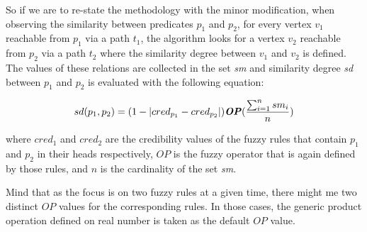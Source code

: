 \documentclass[egilmezThesis.tex]{subfiles}
\begin{document}
So if we are to re-state the methodology with the minor modification, when observing the similarity between predicates \textit{$p_{1}$} and \textit{$p_{2}$}, for every vertex \textit{$v_{1}$} reachable from \textit{$p_{1}$} via a path \textit{$t_{1}$}, the algorithm looks for a vertex \textit{$v_{2}$} reachable from \textit{$p_{2}$} via a path \textit{$t_{2}$} where the similarity degree between \textit{$v_{1}$}  and \textit{$v_{2}$} is defined. The values of these relations are collected in the set \textit{sm} and similarity degree \textit{sd} between \textit{$p_{1}$} and \textit{$p_{2}$} is evaluated with the following equation:

\begin{equation}\label{eq:sd}
\textit{$sd(p_{1}, p_{2})$} =   (1-\lvert  \textit{$cred_{p_{1}}$} - \textit{$cred_{p_{2}}$}  \rvert) \textbf{\emph{OP}} (\frac{\sum_{i=1}^{n} sm_i}{n})
\end{equation}

where $cred_{1}$ and  $cred_{2}$ are the credibility values of the fuzzy rules that contain \textit{$p_{1}$} and \textit{$p_{2}$} in their heads respectively, \textit{$OP$} is the fuzzy operator that is again defined by those rules, and  \textit{$n$} is the cardinality of the set \textit{sm}.

Mind that as the focus is on two fuzzy rules at a given time, there might me two distinct \textit{$OP$} values for the corresponding rules. In those cases, the generic product operation defined on real number is taken as the default \textit{$OP$} value.


\end{document}
